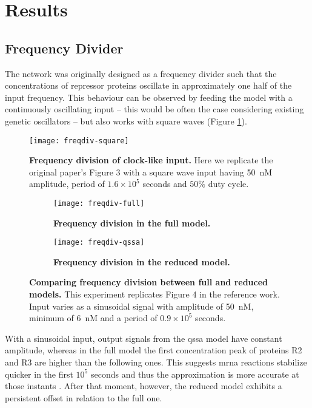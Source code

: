 \section{Results}

  \subsection{Frequency Divider}\label{sec:freq-div}

    The network was originally designed as a frequency divider such that the concentrations of repressor proteins oscillate in approximately one half of the input frequency.
    This behaviour can be observed by feeding the model with a continuously oscillating input -- this would be often the case considering existing genetic oscillators \cite{optoscillator} -- but also works with square waves (Figure \ref{fig:freqdiv-square}).

    \begin{figure}[!htb]
      \centering
      \texttt{[image: freqdiv-square]}
      \caption{\textbf{Frequency division of clock-like input.} Here we replicate the original paper's Figure 3 with a square wave input having \SI{50}{\nano M} amplitude, period of $1.6 \times 10^5$ seconds and $50\%$ duty cycle.}
      \label{fig:freqdiv-square}
    \end{figure}

    \begin{figure}[!htb]
      \centering
      \begin{subfigure}[t]{0.60\textwidth}
        \centering
        \texttt{[image: freqdiv-full]}
        \caption{\textbf{Frequency division in the full model.}}
        \label{fig:freqdiv-full}
      \end{subfigure}
      \begin{subfigure}[t]{0.60\textwidth}
        \centering
        \texttt{[image: freqdiv-qssa]}
        \caption{\textbf{Frequency division in the reduced model.}}
        \label{fig:freqdiv-qssa}
      \end{subfigure}
      \caption{\textbf{Comparing frequency division between full and reduced models.} This experiment replicates Figure 4 in the reference work. Input varies as a sinusoidal signal with amplitude of \SI{50}{\nano M}, minimum of \SI{6}{\nano M} and a period of $0.9 \times 10^5$ seconds.}
      \label{fig:freqdiv-sine}
    \end{figure}

    With a sinusoidal input, output signals from the \ac{qssa} model have constant amplitude, whereas in the full model the first concentration peak of proteins R2 and R3 are higher than the following ones.
    This suggests \acs{mrna} reactions stabilize quicker in the first $10^5$ seconds and thus the approximation is more accurate at those instants \cite{ingalls}.
    After that moment, however, the reduced model exhibits a persistent offset in relation to the full one.

